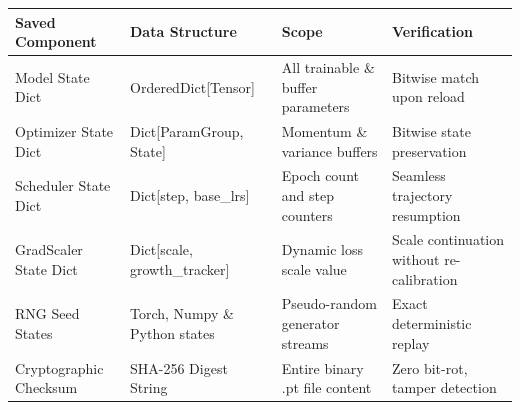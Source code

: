\begin{tabular}{llll}
\toprule
Saved Component & Data Structure & Scope & Verification \\
\midrule
Model State Dict & OrderedDict[Tensor] & All trainable \& buffer parameters & Bitwise match upon reload \\
Optimizer State Dict & Dict[ParamGroup, State] & Momentum \& variance buffers & Bitwise state preservation \\
Scheduler State Dict & Dict[step, base\_lrs] & Epoch count and step counters & Seamless trajectory resumption \\
GradScaler State Dict & Dict[scale, growth\_tracker] & Dynamic loss scale value & Scale continuation without re-calibration \\
RNG Seed States & Torch, Numpy \& Python states & Pseudo-random generator streams & Exact deterministic replay \\
Cryptographic Checksum & SHA-256 Digest String & Entire binary .pt file content & Zero bit-rot, tamper detection \\
\bottomrule
\end{tabular}
